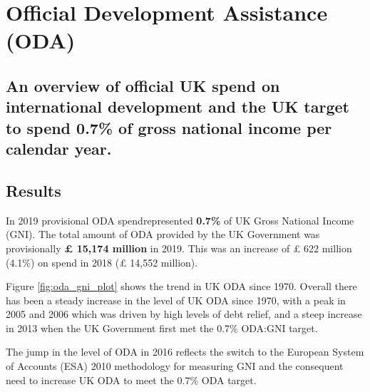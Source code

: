 \chapter{Official Development Assistance (ODA)}

\section*{An overview of official UK spend on international development and the UK target to spend 0.7\% of gross national income per calendar year.}

\thispagestyle{empty}



\section{Results}

In 2019 provisional ODA spend\footnotemark represented \textbf{
0.7\%
} of UK Gross National Income (GNI). %
The total amount of ODA provided by the UK Government was provisionally \textbf{\pounds
15,174 million
} in 2019. %
This was an increase of \pounds
622
million
(4.1\%) on spend in 2018 (\pounds
14,552 million). %


Figure \ref{fig:oda_gni_plot} shows the trend in UK ODA since 1970. %
Overall there has been a steady increase in the level of UK ODA since 1970, with a peak in 2005 and 2006 which was driven by high levels of debt relief, and a steep increase in 2013 when the UK Government first met the 0.7\% ODA:GNI target. %

The jump in the level of ODA in 2016 reflects the switch to the European System of Accounts (ESA) 2010 methodology for measuring GNI and the consequent need to increase UK ODA to meet the 0.7\% ODA target. %


